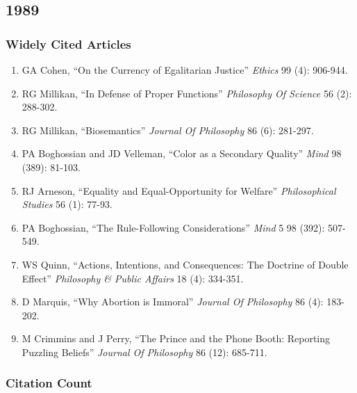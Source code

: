 \documentclass[
  10pt,
  letterpaper,
  DIV=11,
  numbers=noendperiod,
  twoside]{scrartcl}
\providecommand{\tightlist}{%
  \setlength{\itemsep}{0pt}\setlength{\parskip}{0pt}}\usepackage{longtable,booktabs,array}
\begin{document}
\newpage

\subsection{1989}\label{section-13}

\subsubsection*{Widely Cited Articles}\label{widely-cited-articles-13}

\begin{enumerate}
\def\labelenumi{\arabic{enumi}.}
\tightlist
\item
  GA Cohen, ``On the Currency of Egalitarian Justice'' \emph{Ethics} 99
  (4): 906-944.
\item
  RG Millikan, ``In Defense of Proper Functions'' \emph{Philosophy Of
  Science} 56 (2): 288-302.
\item
  RG Millikan, ``Biosemantics'' \emph{Journal Of Philosophy} 86 (6):
  281-297.
\item
  PA Boghossian and JD Velleman, ``Color as a Secondary Quality''
  \emph{Mind} 98 (389): 81-103.
\item
  RJ Arneson, ``Equality and Equal-Opportunity for Welfare''
  \emph{Philosophical Studies} 56 (1): 77-93.
\item
  PA Boghossian, ``The Rule-Following Considerations'' \emph{Mind} 5 98
  (392): 507-549.
\item
  WS Quinn, ``Actions, Intentions, and Consequences: The Doctrine of
  Double Effect'' \emph{Philosophy \& Public Affairs} 18 (4): 334-351.
\item
  D Marquis, ``Why Abortion is Immoral'' \emph{Journal Of Philosophy} 86
  (4): 183-202.
\item
  M Crimmins and J Perry, ``The Prince and the Phone Booth: Reporting
  Puzzling Beliefs'' \emph{Journal Of Philosophy} 86 (12): 685-711.
\end{enumerate}

\subsubsection*{Citation Count}\label{citation-count-13}
\end{document}
